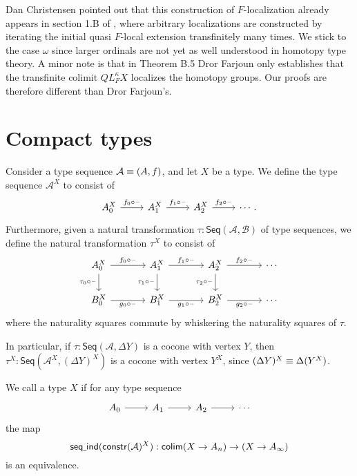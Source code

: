 Dan Christensen pointed out that this construction of $F$-localization already appears in section 1.B of \cite{Farjoun}, where arbitrary localizations are constructed by iterating the initial quasi $F$-local extension transfinitely many times. We stick to the case $\omega$ since larger ordinals are not yet as well understood in homotopy type theory. A minor note is that in Theorem B.5 Dror Farjoun only establishes that the transfinite colimit $QL_F^\kappa X$ localizes the homotopy groups. Our proofs are therefore different than Dror Farjoun's.

\section{Compact types}

\begin{defn}
Consider a type sequence $\mathcal{A}\equiv (A,f)$, and let $X$ be a type. We define the type sequence $\mathcal{A}^X$ to consist of
\begin{equation*}
\begin{tikzcd}
A_0^X \arrow[r,"f_0\circ \blank"] & A_1^X \arrow[r,"f_1\circ\blank"] & A_2^X \arrow[r,"f_2\circ\blank"] & \cdots. 
\end{tikzcd}
\end{equation*}
Furthermore, given a natural transformation $\tau:\mathsf{Seq}(\mathcal{A},\mathcal{B})$ of type sequences, we define the natural transformation $\tau^X$ to consist of
\begin{equation*}
\begin{tikzcd}[column sep=large]
A_0^X \arrow[r,"f_0\circ \blank"] \arrow[d,swap,"\tau_0\circ\blank"] & A_1^X \arrow[r,"f_1\circ\blank"] \arrow[d,swap,"\tau_1\circ\blank"] & A_2^X \arrow[r,"f_2\circ\blank"] \arrow[d,swap,"\tau_2\circ\blank"] & \cdots \\
B_0^X \arrow[r,swap,"g_0\circ \blank"] & B_1^X \arrow[r,swap,"g_1\circ\blank"] & B_2^X \arrow[r,swap,"g_2\circ\blank"] & \cdots
\end{tikzcd}
\end{equation*}
where the naturality squares commute by whiskering the naturality squares of $\tau$. 
\end{defn}

In particular, if $\tau:\mathsf{Seq}(\mathcal{A},\Delta Y)$ is a cocone with vertex $Y$, then $\tau^X :\mathsf{Seq}(\mathcal{A}^X,(\Delta Y)^X)$ is a cocone with vertex $Y^X$, since $(\Delta Y)^X \equiv \Delta (Y^X)$.  

\begin{defn}
We call a type $X$  if for any type sequence
\begin{equation*}
\begin{tikzcd}
A_0 \arrow[r] & A_1 \arrow[r] & A_2 \arrow[r] & \cdots
\end{tikzcd}
\end{equation*}
the map
\begin{equation*}
\mathsf{seq\underline{\ }{}ind}(\mathsf{constr}(\mathcal{A})^X)
  : \mathsf{colim}(X\to A_n)\to(X\to A_\infty)
\end{equation*}
is an equivalence.
\end{defn}


